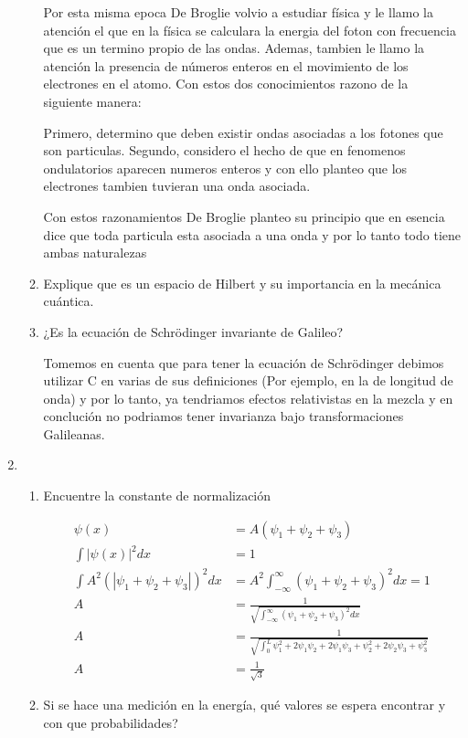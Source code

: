 \documentclass[12pt]{exam}
\begin{document}
\begin{enumerate}
\begin{enumerate}
        Por esta misma epoca De Broglie volvio a estudiar física y le llamo la atención el que en la física se calculara la energia del 
        foton con frecuencia que es un termino propio de las ondas. Ademas, tambien le llamo la atención la presencia de números enteros 
        en el movimiento de los electrones en el atomo. Con estos dos conocimientos razono de la siguiente manera:

        Primero, determino que deben existir ondas asociadas a los fotones que son particulas. Segundo, considero el hecho de que en fenomenos
        ondulatorios aparecen numeros enteros y con ello planteo que los electrones tambien tuvieran una onda  asociada. 

        Con estos razonamientos De Broglie planteo su principio que en esencia dice que toda particula esta asociada a una onda
        y por lo tanto todo tiene ambas naturalezas \cite{Unal_Moderna}

      \item Explique que es un espacio de Hilbert y su importancia en la mecánica cuántica. 
      \item ¿Es la ecuación de Schr\"{o}dinger invariante de Galileo? 

        Tomemos en cuenta que para tener la ecuación de Schr\"{o}dinger
        debimos utilizar C en varias de sus definiciones (Por ejemplo, en la de longitud de onda) y por lo tanto, ya tendriamos efectos
        relativistas en la mezcla y en conclución no podriamos tener invarianza bajo transformaciones Galileanas.
	\end{enumerate}
\item \begin{enumerate}
		\item Encuentre la constante de normalización

			\begin{align*}
				\psi (x) &= A(\psi_1 + \psi_2 + \psi_3)\\
				\int |\psi (x)|^2dx &= 1\\
				\int A^2(|\psi_1+\psi_2+\psi_3|)^2dx &= A^2 \int_{-\infty}^\infty (\psi_1 + \psi_2 +\psi_3)^2 dx=1\\
				A &= \frac{1}{\sqrt{\int_{-\infty}^\infty (\psi_1 + \psi_2 + \psi_3)^2 dx}}\\
				A &= \frac{1}{\sqrt{\int_0^L \psi_1^2 + 2\psi_1\psi_2 + 2\psi_1\psi_3 + \psi_2^2 + 2\psi_2\psi_3 + \psi_3^2}}\\
				A &= \frac{1}{\sqrt{3}}
			\end{align*}
		\item Si se hace una medición en la energía, qué valores se espera encontrar y con que probabilidades?


\end{enumerate}
\end{enumerate}
\end{document}
